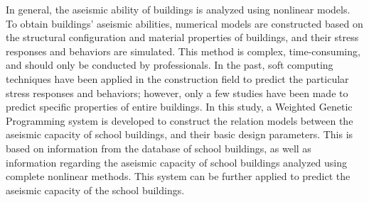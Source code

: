 In general, the aseismic ability of buildings is analyzed using nonlinear models. To obtain buildings’ aseismic abilities, numerical models are constructed based on the structural configuration and material properties of buildings, and their stress responses and behaviors are simulated. This method is complex, time-consuming, and should only be conducted by professionals. In the past, soft computing techniques have been applied in the construction field to predict the particular stress responses and behaviors; however, only a few studies have been made to predict specific properties of entire buildings. In this study, a Weighted Genetic Programming system is developed to construct the relation models between the aseismic capacity of school buildings, and their basic design parameters. This is based on information from the database of school buildings, as well as information regarding the aseismic capacity of school buildings analyzed using complete nonlinear methods. This system can be further applied to predict the aseismic capacity of the school buildings.

